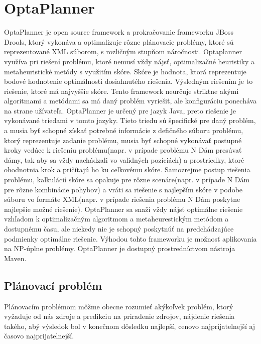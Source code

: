 \chapter{OptaPlanner}\label{optaplannerC}
OptaPlanner je open source framework a prokračovanie frameworku JBoss Drools, ktorý vykonáva a optimalizuje rôzne plánovacie problémy, ktoré sú reprezentované XML súborom, s rozličným stupňom náročnosti. Optaplanner využíva pri riešení problému, ktoré nemusí vždy nájsť, optimalizačné heuristiky a metaheuristické metódy s využitím skóre. Skóre je hodnota, ktorá reprezentuje bodové hodnotenie optimálnosti dosiahnutého riešenia. Výsledným riešením je to riešenie, ktoré má najvyššie skóre. Tento framework neurčuje striktne akými algoritmami a metódami sa má daný problém vyriešiť, ale konfiguráciu ponecháva na strane užívateľa. OptaPlanner je určený pre jazyk Java, preto riešenie je vykonávané triedami v tomto jazyky. Tieto triedu sú špecifické pre daný problém, a musia byť schopné získať potrebné informácie z defičného súboru problému, ktorý reprezentuje zadanie problému, musia byť schopné vykonávať postupné kroky vedúce k riešeniu problému(napr. v prípade problému N Dám presúvať dámy, tak aby sa vždy nachádzali vo validných pozíciách) a prostriedky, ktoré ohodnotnia krok a pričítajú ho ku celkovému skóre. \newline \indent Samozrejme postup riešenia problému, kalkulácií skóre sa opakuje pre rôzne scenáre(napr. v prípade N Dám pre rôzne kombinácie pohybov) a vráti sa riešenie s najlepším skóre v podobe súboru vo formáte XML(napr. v prípade riešenia problému N Dám poskytne najlepšie možné riešenie). OptaPlanner sa snaží vždy nájsť optimálne riešenie vzhľadom k optimalizačným algoritmom a metaheurestickým metódom a dostupnému času, ale niekedy nie je schopný poskytnúť na predchádzajúce podmienky optimálne riešenie. Výhodou tohto frameworku je možnosť aplikovania na NP-úplne problémy. OptaPlanner je dostupný prostredníctvom nástroja Maven.

\section{Plánovací problém}\label{planprob}
Plánovacím problémom môžme obecne rozumieť akýkoľvek problém, ktorý vyžaduje od nás zdroje a predikciu na priradenie zdrojov, nájdenie riešenia takého, abý výsledok bol v konečnom dôsledku najlepší, cenovo najprijatelnejší aj časovo najprijatelnejší.

